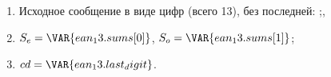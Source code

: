 \begin{enumerate}
\item Исходное сообщение в виде цифр (всего 13), без последней:
;,

\item $S_e = \VAR{ean_13.sums[0]}$, $S_o = \VAR{ean_13.sums[1]}$;
\item $cd = \VAR{ean_13.last_digit}$.
\end{enumerate}